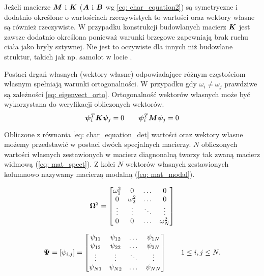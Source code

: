 Jeżeli macierze $\bm{M}$ i $\bm{K}$ ($\bm{A}$ i $\bm{B}$ wg \ref{eq: char_equation2}) są symetryczne i dodatnio określone o wartościach rzeczywistych to wartości oraz wektory własne są również rzeczywiste. W przypadku konstrukcji budowlanych macierz $\bm{K}$ jest zawsze dodatnio określona ponieważ warunki brzegowe zapewniają brak ruchu ciała jako bryły sztywnej. Nie jest to oczywiste dla innych niż budowlane struktur, takich jak np. samolot w locie \parencite{Chopra2012a}.


Postaci drgań własnych (wektory własne) odpowiadające różnym częstościom własnym spełniają warunki ortogonalności. W przypadku gdy $\omega_i \neq \omega_j$ prawdziwe są zależności \ref{eq: eigenvect_orto}. Ortogonalność wektorów własnych może być wykorzystana do weryfikacji obliczonych wektorów. 
\begin{equation} \label{eq: eigenvect_orto}
\bm{\psi}_i^{T}\bm{K\psi}_j = 0 \qquad \bm{\psi}_i^{T}\bm{M\psi}_j = 0
\end{equation}

Obliczone z równania \ref{eq: char_equation_det} wartości oraz wektory własne możemy przedstawić w postaci dwóch specjalnych macierzy. $N$ obliczonych wartości własnych zestawionych w macierz diagnonalną tworzy tak zwaną macierz widmową (\ref{eq: mat_spect}). Z kolei $N$ wektorów własnych zestawionych kolumnowo nazywamy macierzą modalną (\ref{eq: mat_modal}).

\begin{equation}  \label{eq: mat_spect}
\bm{\Omega}^2 =  
\begin{bmatrix} 
	\omega_{1}^2 & 0 			& \dots  & 0      \\ 
	0 		     & \omega_{2}^2 & \dots  & 0      \\
	\vdots       & \vdots       & \ddots & \vdots \\
	0 			 & 0 		    & \dots  & \omega_{N}^2 


\end{bmatrix}
\end{equation}

\begin{equation} \label{eq: mat_modal}
	\bm{\Psi} = [\psi_{i,j}]= 
	\begin{bmatrix} 
		\psi_{11} & \psi_{12} & \dots & \psi_{1N} \\ 
		\psi_{12} & \psi_{22} & \dots & \psi_{2N} \\
		\vdots    & \vdots    & \ddots & \vdots \\
		\psi_{N1} & \psi_{N2} & \dots & \psi_{NN} 
	
	
	\end{bmatrix}
	\qquad
	1\leq i,j \leq N.
\end{equation}

